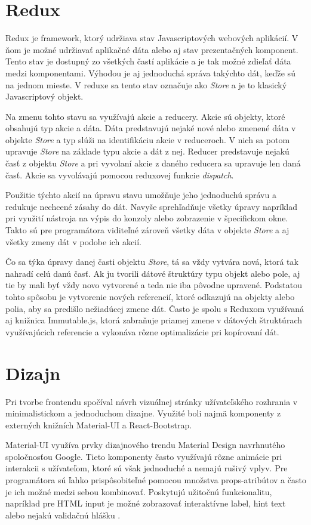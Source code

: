 \documentclass[
  digital, %
  table,   %
  lof,     %
  lot,     %
]{fithesis3}
\begin{document}
\section{Redux}
Redux je framework, ktorý udržiava stav Javascriptových webových aplikácií. V ňom je možné udržiavať aplikačné dáta alebo aj stav prezentačných komponent. Tento stav je dostupný zo všetkých častí aplikácie a je tak možné zdieľať dáta medzi komponentami. Výhodou je aj jednoduchá správa takýchto dát, keďže sú na jednom mieste. V reduxe sa tento stav označuje ako \textit{Store} a je to klasický Javascriptový objekt.

Na zmenu tohto stavu sa využívajú akcie a reducery. Akcie sú objekty, ktoré obsahujú typ akcie a dáta. Dáta predstavujú nejaké nové alebo zmenené dáta v objekte \textit{Store} a typ slúži na identifikáciu akcie v reduceroch. V nich sa potom upravuje \textit{Store} na základe typu akcie a dát z nej. Reducer predstavuje nejakú časť z objektu \textit{Store} a pri vyvolaní akcie z daného reducera sa upravuje len daná časť. Akcie sa vyvolávajú pomocou reduxovej funkcie \textit{dispatch}.

Použitie týchto akcií na úpravu stavu umožňuje jeho jednoduchú správu a redukuje nechcené zásahy do dát. Navyše sprehľadňuje všetky úpravy napríklad pri využití nástroja na výpis do konzoly alebo zobrazenie v špecifickom okne. Takto sú pre programátora viditeľné zároveň všetky dáta v objekte \textit{Store} a aj všetky zmeny dát v podobe ich akcií.

Čo sa týka úpravy danej časti objektu \textit{Store}, tá sa vždy vytvára nová, ktorá tak nahradí celú danú časť. Ak ju tvorili dátové štruktúry typu objekt alebo pole, aj tie by mali byť vždy novo vytvorené a teda nie iba pôvodne upravené. Podstatou tohto spôsobu je vytvorenie nových referencií, ktoré odkazujú na objekty alebo polia, aby sa predišlo nežiadúcej zmene dát. Často je spolu s Reduxom využívaná aj knižnica Immutable.js, ktorá zabraňuje priamej zmene v dátových štruktúrach využívajúcich referencie a vykonáva rôzne optimalizácie pri kopírovaní dát.

\section{Dizajn}
Pri tvorbe frontendu spočíval návrh vizuálnej stránky užívateľského rozhrania v minimalistickom a jednoduchom dizajne. Využité boli najmä komponenty z externých knižních Material-UI a React-Bootstrap.

Material-UI využíva prvky dizajnového trendu Material Design navrhnutého spoločnosťou Google. Tieto komponenty často využívajú rôzne animácie pri interakcii s užívateľom, ktoré sú však jednoduché a nemajú rušivý vplyv. Pre programátora sú ľahko prispôsobiteľné pomocou množstva props-atribútov a často je ich možné medzi sebou kombinovať. Poskytujú užitočnú funkcionalitu, napríklad pre HTML input je možné zobrazovať interaktívne label, hint text alebo nejakú validačnú hlášku \parencite{materialui}.
\end{document}
